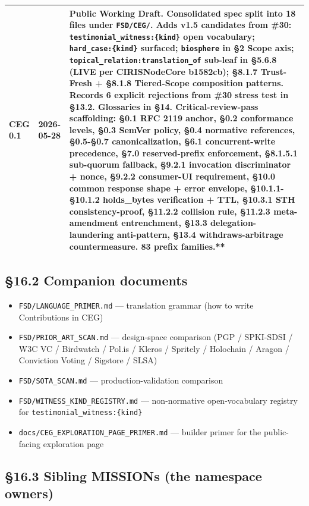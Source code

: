 \documentclass[10pt]{article}
\begin{document}
{\begin{longtable}{|p{5.33cm}|p{5.33cm}|p{5.33cm}|}
CEG 0.1 & 2026-05-28 & Public Working Draft. Consolidated spec split into 18 files under \texttt{FSD/CEG/}. Adds v1.5 candidates from \#30: \texttt{testimonial\_witness:\{kind\}} open vocabulary; \texttt{hard\_case:\{kind\}} surfaced; \texttt{biosphere} in §2 Scope axis; \texttt{topical\_relation:translation\_of} sub-leaf in §5.6.8 (LIVE per CIRISNodeCore b1582cb); §8.1.7 Trust-Fresh + §8.1.8 Tiered-Scope composition patterns. Records 6 explicit rejections from \#30 stress test in §13.2. Glossaries in §14. Critical-review-pass scaffolding: §0.1 RFC 2119 anchor, §0.2 conformance levels, §0.3 SemVer policy, §0.4 normative references, §0.5-§0.7 canonicalization, §6.1 concurrent-write precedence, §7.0 reserved-prefix enforcement, §8.1.5.1 sub-quorum fallback, §9.2.1 invocation discriminator + nonce, §9.2.2 consumer-UI requirement, §10.0 common response shape + error envelope, §10.1.1-§10.1.2 holds\_bytes verification + TTL, §10.3.1 STH consistency-proof, §11.2.2 collision rule, §11.2.3 meta-amendment entrenchment, §13.3 delegation-laundering anti-pattern, §13.4 withdraws-arbitrage countermeasure. 83 prefix families.** \\ \hline
\end{longtable}}


\subsection*{§16.2 Companion documents}


\begin{itemize}\setlength\itemsep{0pt}
\item \texttt{FSD/LANGUAGE\_PRIMER.md} — translation grammar (how to write Contributions in CEG)
\item \texttt{FSD/PRIOR\_ART\_SCAN.md} — design-space comparison (PGP / SPKI-SDSI / W3C VC / Birdwatch / Pol.is / Kleros / Spritely / Holochain / Aragon / Conviction Voting / Sigstore / SLSA)
\item \texttt{FSD/SOTA\_SCAN.md} — production-validation comparison
\item \texttt{FSD/WITNESS\_KIND\_REGISTRY.md} — non-normative open-vocabulary registry for \texttt{testimonial\_witness:\{kind\}}
\item \texttt{docs/CEG\_EXPLORATION\_PAGE\_PRIMER.md} — builder primer for the public-facing exploration page
\end{itemize}


\subsection*{§16.3 Sibling MISSIONs (the namespace owners)}
\end{document}
